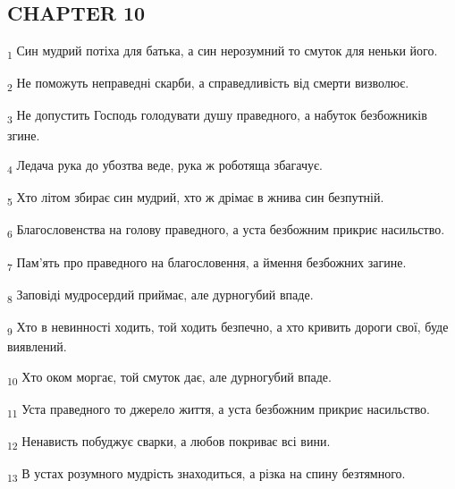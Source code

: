 \subsection{CHAPTER 10}
\begin{tcolorbox}
\textsubscript{1} Син мудрий потіха для батька, а син нерозумний то смуток для неньки його.
\end{tcolorbox}
\begin{tcolorbox}
\textsubscript{2} Не поможуть неправедні скарби, а справедливість від смерти визволює.
\end{tcolorbox}
\begin{tcolorbox}
\textsubscript{3} Не допустить Господь голодувати душу праведного, а набуток безбожників згине.
\end{tcolorbox}
\begin{tcolorbox}
\textsubscript{4} Ледача рука до убозтва веде, рука ж роботяща збагачує.
\end{tcolorbox}
\begin{tcolorbox}
\textsubscript{5} Хто літом збирає син мудрий, хто ж дрімає в жнива син безпутній.
\end{tcolorbox}
\begin{tcolorbox}
\textsubscript{6} Благословенства на голову праведного, а уста безбожним прикриє насильство.
\end{tcolorbox}
\begin{tcolorbox}
\textsubscript{7} Пам'ять про праведного на благословення, а ймення безбожних загине.
\end{tcolorbox}
\begin{tcolorbox}
\textsubscript{8} Заповіді мудросердий приймає, але дурногубий впаде.
\end{tcolorbox}
\begin{tcolorbox}
\textsubscript{9} Хто в невинності ходить, той ходить безпечно, а хто кривить дороги свої, буде виявлений.
\end{tcolorbox}
\begin{tcolorbox}
\textsubscript{10} Хто оком моргає, той смуток дає, але дурногубий впаде.
\end{tcolorbox}
\begin{tcolorbox}
\textsubscript{11} Уста праведного то джерело життя, а уста безбожним прикриє насильство.
\end{tcolorbox}
\begin{tcolorbox}
\textsubscript{12} Ненависть побуджує сварки, а любов покриває всі вини.
\end{tcolorbox}
\begin{tcolorbox}
\textsubscript{13} В устах розумного мудрість знаходиться, а різка на спину безтямного.
\end{tcolorbox}
